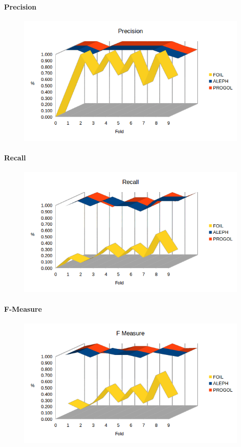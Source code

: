 \paragraph{Precision}
\begin{figure}[h!tbp]
	\includegraphics[width=1.2\textwidth]{img/datasetGraph/mlj/nodiscr/precision.png}
	\label{mljnodiscr-Precision}
\end{figure}
\paragraph{Recall}
\begin{figure}[h!tbp]
	\includegraphics[width=1.2\textwidth]{img/datasetGraph/mlj/nodiscr/recall.png}
	\label{mljnodiscr-Recall}
\end{figure}
\paragraph{F-Measure}
\begin{figure}[h!tbp]
	\includegraphics[width=1.2\textwidth]{img/datasetGraph/mlj/nodiscr/fm.png}
	\label{mljnodiscr-F-measure}
\end{figure}
